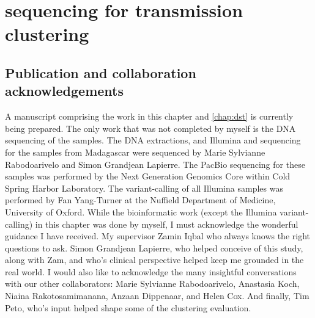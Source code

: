 
\chapter{\ont{} sequencing for \mtb{} transmission clustering}
\label{chap:clustering}

\ifpdf
    \graphicspath{{Chapter2/Figs/Raster/}{Chapter2/Figs/PDF/}{Chapter2/Figs/}}
\else
    \graphicspath{{Chapter2/Figs/Vector/}{Chapter2/Figs/}}
\fi


\setcounter{section}{-1}
\section{Publication and collaboration acknowledgements}

A manuscript comprising the work in this chapter and \autoref{chap:dst} is currently being prepared. The only work that was not completed by myself is the DNA sequencing of the samples.
The DNA extractions, and Illumina and \ont{} sequencing for the samples from Madagascar were sequenced by Marie Sylvianne Rabodoarivelo and Simon Grandjean Lapierre. The PacBio sequencing for these samples was performed by the Next Generation Genomics Core within Cold Spring Harbor Laboratory.
The variant-calling of all Illumina samples was performed by Fan Yang-Turner at the Nuffield Department of Medicine, University of Oxford. 
While the bioinformatic work (except the Illumina variant-calling) in this chapter was done by myself, I must acknowledge the wonderful guidance I have received. My supervisor Zamin Iqbal who always knows the right questions to ask. Simon Grandjean Lapierre, who helped conceive of this study, along with Zam, and who's clinical perspective helped keep me grounded in the real world. I would also like to acknowledge the many insightful conversations with our other collaborators: Marie Sylvianne Rabodoarivelo, Anastasia Koch, Niaina Rakotosamimanana, Anzaan Dippenaar, and Helen Cox. And finally, Tim Peto, who's input helped shape some of the clustering evaluation.

